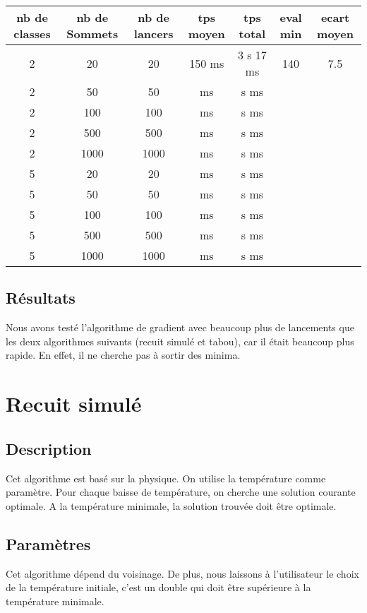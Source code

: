 \documentclass[12pt]{article}
\begin{document}
\begin{tabular}{|c|c|c|c|c|c|c|}
	\hline 
	nb de classes & nb de Sommets & nb de lancers & tps moyen & tps total & eval min & ecart moyen \\
	\hline
	2 & 20 & 20 & 150 ms & 3 s 17 ms & 140 & 7.5 \\
	\hline
	2 &  50  &  50  &     ms   &    s    ms   &     &     \\
	\hline
	2 &  100  &  100  &     ms   &   s    ms    &     &     \\
	\hline
	2 &  500  &  500  &      ms  &    s    ms   &     &     \\
	\hline
	2 &  1000  &  1000  &    ms    &   s    ms    &     &     \\
	\hline
	\hline
	5 &  20  &  20  &     ms   &   s    ms    &     &     \\
	\hline
	5 &  50  &  50  &     ms   &   s     ms   &     &     \\
	\hline
	5 &  100  & 100   &     ms   &   s    ms    &     &     \\
	\hline
	5 & 500   & 500   &     ms   &   s     ms   &     &     \\
	\hline
	5 &  1000  &  1000  &     ms   &   s    ms    &     &     \\
	\hline
\end{tabular}

\subsection{Résultats}

Nous avons testé l’algorithme de gradient avec beaucoup plus de lancements que les deux algorithmes suivants (recuit simulé et tabou), car il était beaucoup plus rapide. En effet, il ne cherche pas à sortir des minima.

\newpage

\section{Recuit simulé}
\subsection{Description}
Cet algorithme est basé sur la physique. On utilise la température comme paramètre. Pour chaque baisse de température, on cherche une solution courante optimale. A la température minimale, la solution trouvée doit être optimale.

\subsection{Paramètres}
Cet algorithme dépend du voisinage. De plus, nous laissons à l’utilisateur le choix de la température initiale, c’est un double qui doit être supérieure à la température minimale.
\end{document}
